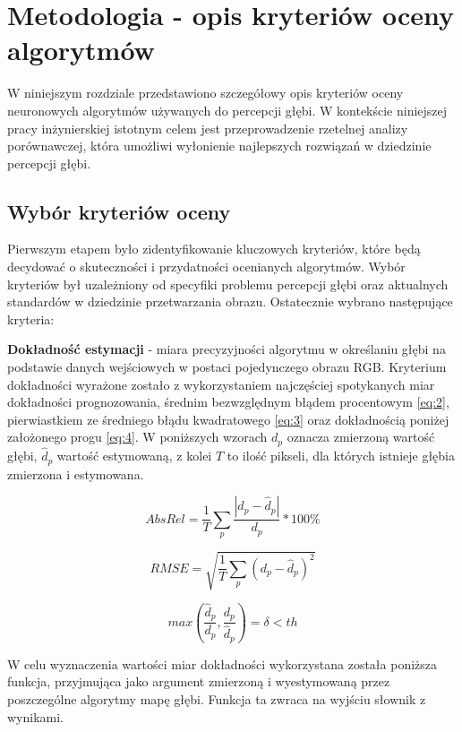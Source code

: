 \chapter{Metodologia - opis kryteriów oceny algorytmów}\label{chap:metodologia}

W niniejszym rozdziale przedstawiono szczegółowy opis kryteriów oceny neuronowych algorytmów używanych do percepcji głębi. W kontekście niniejszej pracy inżynierskiej istotnym celem jest przeprowadzenie rzetelnej analizy porównawczej, która umożliwi wyłonienie najlepszych rozwiązań w dziedzinie percepcji głębi.

\section{Wybór kryteriów oceny}
Pierwszym etapem było zidentyfikowanie kluczowych kryteriów, które będą decydować o skuteczności i przydatności ocenianych algorytmów. Wybór kryteriów był uzależniony od specyfiki problemu percepcji głębi oraz aktualnych standardów w dziedzinie przetwarzania obrazu. Ostatecznie wybrano następujące kryteria:

\textbf{Dokładność estymacji} - miara precyzyjności algorytmu w określaniu głębi na podstawie danych wejściowych w postaci pojedynczego obrazu RGB. Kryterium dokładności wyrażone zostało z wykorzystaniem najczęściej spotykanych miar dokładności prognozowania, średnim bezwzględnym błądem procentowym \ref{eq:2}, pierwiastkiem ze średniego błądu kwadratowego \ref{eq:3} oraz dokładnością poniżej założonego progu \ref{eq:4}. W poniższych wzorach $ d_p $ oznacza zmierzoną wartość głębi, $ \hat{d}_p $ wartość estymowaną, z kolei $ T $ to ilość pikseli, dla których istnieje głębia zmierzona i estymowana.

\begin{equation} \label{eq:2}
    AbsRel = \frac{1}{T} \sum_{p} \frac{|d_p - \hat{d}_p|}{d_p} * 100\%
\end{equation}

\begin{equation} \label{eq:3}
    RMSE = \sqrt{\frac{1}{T} \sum_{p} (d_p - \hat{d}_p)^2}
\end{equation}

\begin{equation} \label{eq:4}
    max(\frac{\hat{d}_p}{d_p}, \frac{d_p}{\hat{d}_p}) = \delta < th
\end{equation}

W celu wyznaczenia wartości miar dokładności wykorzystana została poniższa funkcja, przyjmująca jako argument zmierzoną i wyestymowaną przez poszczególne algorytmy mapę głębi. Funkcja ta zwraca na wyjściu słownik z wynikami.

